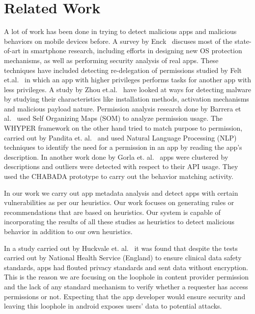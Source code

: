 \section{Related Work}
\label{RelatedWork}
\noindent
A lot of work has been done in trying to detect malicious apps and malicious behaviors on mobile devices before. A survey by Enck~\cite{Enck2011Defending} discuses most of the state-of-art in smartphone research, including efforts in designing new OS protection mechanisms, as well as performing security analysis of real apps. These techniques have included detecting re-delegation of permissions studied by Felt et.al.~\cite{Felt11permissionReDelegation} in which an app with higher privileges performs tasks for another app with less privileges. A study by Zhou et.al.~\cite{Zhou2012MalwareGenomeProject} have looked at ways for detecting malware by studying their characteristics like installation methods, activation mechanisms and malicious payload nature. Permission analysis research done by Barrera et al.~\cite{Barrera2010SOM} used Self Organizing Maps (SOM) to analyze permission usage. The WHYPER framework on the other hand tried to match purpose to permission, carried out by Pandita et. al.~\cite{Pandita2013Whyper} and used Natural Language Processing (NLP) techniques to identify the need for a permission in an app by reading the app's description. In another work done by Gorla et. al.~\cite{GorlaCheckingAppBehavior2014} apps were clustered by descriptions and outliers were detected with respect to their API usage. They used the CHABADA prototype to carry out the behavior matching activity. 

In our work we carry out app metadata analysis and detect apps with certain vulnerabilities as per our heuristics. Our work focuses on generating rules or recommendations that are based on heuristics. Our system is capable of incorporating the results of all these studies as heuristics to detect malicious behavior in addition to our own heuristics.

In a study carried out by Huckvale et. al.~\cite{raey} it was found that despite the tests carried out by National Health Service (England) to ensure clinical data safety standards, apps had flouted privacy standards and sent data without encryption. This is the reason we are focusing on the loophole in content provider permission and the lack of any standard mechanism to verify whether a requester has access permissions or not. Expecting that the app developer would ensure security and leaving this loophole in android exposes users' data to potential attacks.

